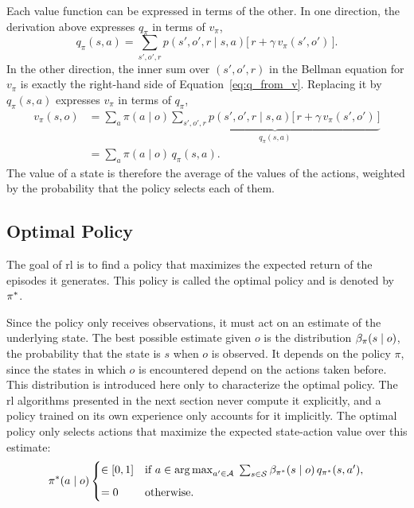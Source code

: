Each value function can be expressed in terms of the other.
In one direction, the derivation above expresses \(q_\pi\) in terms of \(v_\pi\),
\begin{equation}
q_\pi(s, a) = \sum_{s', o', r} p(s', o', r \mid s, a) \Big[\, r + \gamma \, v_\pi(s', o') \,\Big].
\label{eq:q_from_v}
\end{equation}
In the other direction, the inner sum over \((s', o', r)\) in the Bellman equation for \(v_\pi\) is exactly the right-hand side of Equation~\eqref{eq:q_from_v}.
Replacing it by \(q_\pi(s, a)\) expresses \(v_\pi\) in terms of \(q_\pi\),
\begin{equation}
\begin{aligned}
v_\pi(s, o)
&= \sum_{a} \pi(a \mid o) \underbrace{\sum_{s', o', r} p(s', o', r \mid s, a) \Big[\, r + \gamma \, v_\pi(s', o') \,\Big]}_{q_\pi(s, a)} \\
&= \sum_{a} \pi(a \mid o) \, q_\pi(s, a).
\end{aligned}
\label{eq:v_from_q}
\end{equation}
The value of a state is therefore the average of the values of the actions, weighted by the probability that the policy selects each of them.

\subsection{Optimal Policy}
\label{subsec:optimal_policy}

The goal of \gls{rl} is to find a policy that maximizes the expected return of the episodes it generates.
This policy is called the optimal policy and is denoted by \(\pi^{*}\).

Since the policy only receives observations, it must act on an estimate of the underlying state.
The best possible estimate given \(o\) is the distribution \(\beta_{\pi}(s \mid o)\), the probability that the state is \(s\) when \(o\) is observed.
It depends on the policy \(\pi\), since the states in which \(o\) is encountered depend on the actions taken before.
This distribution is introduced here only to characterize the optimal policy.
The \gls{rl} algorithms presented in the next section never compute it explicitly, and a policy trained on its own experience only accounts for it implicitly.
The optimal policy only selects actions that maximize the expected state-action value over this estimate:
\[
\pi^{*}(a \mid o)
\begin{cases}
\in [0, 1] & \text{if } a \in \operatorname*{arg\,max}_{a' \in \mathcal{A}}\;
\sum_{s \in \mathcal{S}} \beta_{\pi^{*}}(s \mid o)\, q_{\pi^{*}}(s, a'), \\[6pt]
= 0 & \text{otherwise}.
\end{cases}
\]

